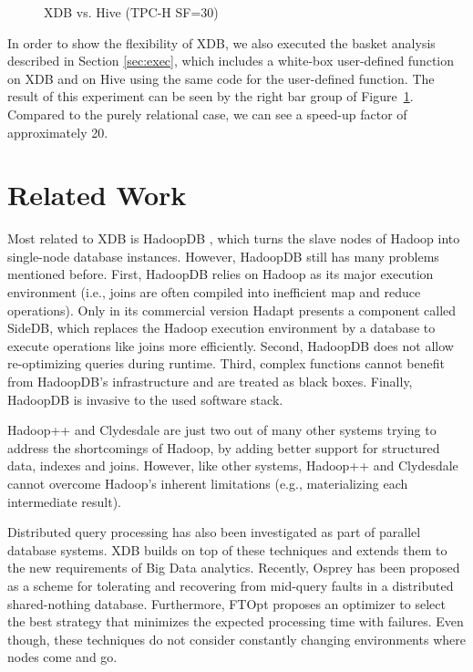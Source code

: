 \documentclass{sig-alternate}
\begin{document}
\begin{figure}[ht] 
\hspace{-4ex}
\vspace{-3ex}
\caption{XDB vs. Hive (TPC-H SF=30)}
\vspace{-1ex}
\label{fig:perf}
\end{figure}

In order to show the flexibility of XDB, we also executed the basket analysis described in Section \ref{sec:exec}, which includes a white-box user-defined function on XDB and on Hive using the same code for the user-defined function. The result of this experiment can be seen by the right bar group of Figure~\ref{fig:perf}. Compared to the purely relational case, we can see a speed-up factor of approximately 20. 

\section{Related Work}
\label{sec:rel}

Most related to XDB is HadoopDB \cite{HadoopDB:SIGMOD:2010}, which turns the slave nodes of Hadoop into single-node database instances. However, HadoopDB still has many problems mentioned before. First, HadoopDB relies on Hadoop as its major execution environment (i.e., joins are often compiled into inefficient map and reduce operations). Only in its commercial version Hadapt \cite{Hadapt:SIGMOD:2011} presents a component called SideDB, which replaces the Hadoop execution environment by a database to execute operations like joins more efficiently. Second, HadoopDB does not allow re-optimizing queries during runtime. Third, complex functions cannot benefit from HadoopDB's infrastructure and are treated as black boxes. Finally, HadoopDB is invasive to the used software stack. 

Hadoop++ \cite{HadoopPP:PVLDB:2010} and 	Clydesdale \cite{Clydesdale:EDBT:2012} are just two out of many other systems trying to address the shortcomings of Hadoop, by adding better support for structured data, indexes and joins. However, like other systems, Hadoop++ and Clydesdale cannot overcome Hadoop's inherent limitations (e.g., materializing each intermediate result).


Distributed query processing has also been investigated as part of parallel database systems. XDB builds on top of these techniques and extends them to the new requirements of Big Data analytics. Recently, Osprey \cite{Osprey:EDBT:2012} has been proposed as a scheme for tolerating and recovering from mid-query faults in a distributed shared-nothing database. Furthermore, FTOpt \cite{FOpt:SIGMOD:2011} proposes an optimizer to select the best strategy that minimizes the expected processing time with failures. Even though, these techniques do not consider constantly changing environments where nodes come and go.
\end{document}
